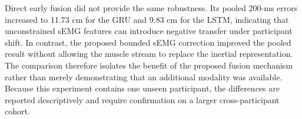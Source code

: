 Direct early fusion did not provide the same robustness. Its pooled 200-ms
errors increased to 11.73 cm for the GRU and 9.83 cm for the LSTM, indicating
that unconstrained sEMG features can introduce negative transfer under
participant shift. In contrast, the proposed bounded sEMG correction improved
the pooled result without allowing the muscle stream to replace the inertial
representation. The comparison therefore isolates the benefit of the proposed
fusion mechanism rather than merely demonstrating that an additional modality
was available. Because this experiment contains one unseen participant, the
differences are reported descriptively and require confirmation on a larger
cross-participant cohort.
